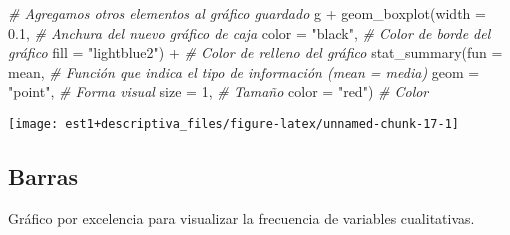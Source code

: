 \documentclass[
]{book}
\newenvironment{Shaded}{\begin{snugshade}}{\end{snugshade}}
\newcommand{\AttributeTok}[1]{\textcolor[rgb]{0.77,0.63,0.00}{#1}}
\newcommand{\CommentTok}[1]{\textcolor[rgb]{0.56,0.35,0.01}{\textit{#1}}}
\newcommand{\DecValTok}[1]{\textcolor[rgb]{0.00,0.00,0.81}{#1}}
\newcommand{\FloatTok}[1]{\textcolor[rgb]{0.00,0.00,0.81}{#1}}
\newcommand{\FunctionTok}[1]{\textcolor[rgb]{0.00,0.00,0.00}{#1}}
\newcommand{\NormalTok}[1]{#1}
\newcommand{\OtherTok}[1]{\textcolor[rgb]{0.56,0.35,0.01}{#1}}
\newcommand{\SpecialCharTok}[1]{\textcolor[rgb]{0.00,0.00,0.00}{#1}}
\newcommand{\StringTok}[1]{\textcolor[rgb]{0.31,0.60,0.02}{#1}}
\begin{document}
\begin{Shaded}
\begin{Highlighting}[]
\CommentTok{\# Agregamos otros elementos al gráfico guardado}
\NormalTok{g }\SpecialCharTok{+} \FunctionTok{geom\_boxplot}\NormalTok{(}\AttributeTok{width =} \FloatTok{0.1}\NormalTok{, }\CommentTok{\# Anchura del nuevo gráfico de caja}
                 \AttributeTok{color =} \StringTok{"black"}\NormalTok{, }\CommentTok{\# Color de borde del gráfico}
                 \AttributeTok{fill =} \StringTok{"lightblue2"}\NormalTok{) }\SpecialCharTok{+} \CommentTok{\# Color de relleno del gráfico}
  \FunctionTok{stat\_summary}\NormalTok{(}\AttributeTok{fun =}\NormalTok{ mean, }\CommentTok{\# Función que indica el tipo de información (mean = media)}
               \AttributeTok{geom =} \StringTok{"point"}\NormalTok{, }\CommentTok{\# Forma visual}
               \AttributeTok{size =} \DecValTok{1}\NormalTok{, }\CommentTok{\# Tamaño}
               \AttributeTok{color =} \StringTok{"red"}\NormalTok{) }\CommentTok{\# Color}
\end{Highlighting}
\end{Shaded}

\begin{center}\texttt{[image: est1+descriptiva\_files/figure-latex/unnamed-chunk-17-1]} \end{center}

\hypertarget{barras}{%
\subsection{Barras}\label{barras}}

Gráfico por excelencia para visualizar la frecuencia de variables cualitativas.

\begin{Shaded}
\end{Shaded}
\end{document}
